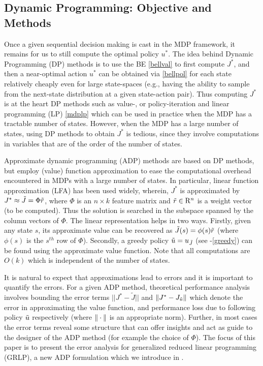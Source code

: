\subsection{Dynamic Programming: Objective and Methods}
Once a given sequential decision making is cast in the MDP framework, it remains for us to still compute the optimal policy $u^*$. The idea behind Dynamic Programming (DP) methods is to use the BE \eqref{bellval} to first compute $J^*$, and then a near-optimal action $u^*$ can be obtained via \eqref{bellpol}
for each state relatively cheaply even for large state-spaces (e.g., having the ability to sample from the next-state distribution at
a given state-action pair). Thus computing $J^*$ is at the heart DP methods \cite{BertB} such as value-, or policy-iteration and linear programming (LP) \eqref{mdplp} which can be used in practice when the MDP has a tractable number of states. However, when the MDP has a large number of states, using DP methods to obtain $J^*$ is tedious, since they involve computations in variables that are of the order of the number of states.\par
Approximate dynamic programming (ADP) methods are based on DP methods, but employ (value) function approximation to ease the computational overhead encountered in MDPs with a large number of states. In particular, linear function approximation (LFA) has been used widely, wherein, $J^*$ is approximated by $J^*\approx\tilde{J} =\Phi \tilde{r}$, where $\Phi$ is an $n\times k$ feature matrix and $\tilde{r}\in \mathrm{R}^n$ is a weight vector (to be computed). Thus the solution is searched in the subspace spanned by the column vectors of $\Phi$. The linear representation helps in two ways. Firstly, given any state $s$, its approximate value can be recovered as $\tilde{J}(s)=\phi(s) \tilde{r}$ (where $\phi(s)$ is the $s^{th}$ row of $\Phi$). Secondly, a greedy policy $\tilde{u}=u_{\tilde{J}}$ (see -\eqref{greedy}) can be found using the approximate value function. Note that all computations are $O(k)$ which is independent of the number of states.\par
It is natural to expect that approximations lead to errors and it is important to quantify the errors. For a given ADP method, theoretical performance analysis involves  bounding the error terms $||J^*-\tilde{J}||$  and $\|J^*-J_{\tilde{u}}\|$ which denote the error in approximating the value function, and performance loss due to following policy $\tilde{u}$ respectively (where $\|\cdot\|$ is an appropriate norm). Further, in most cases the error terms reveal some structure that can offer insights and act as guide to the designer of the ADP method (for example the choice of $\Phi$). The focus of this paper is to present the error analysis for generalized reduced linear programming (GRLP), a new ADP formulation which we introduce in .
